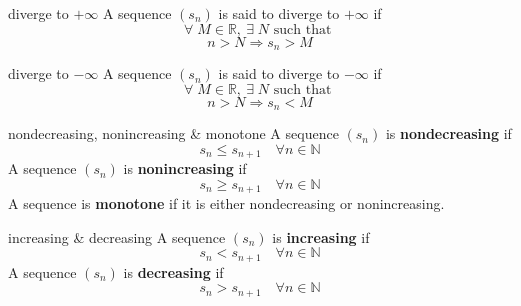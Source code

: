 \documentclass[avery5371,grid]{flashcards}
\newcommand{\N}{\mathbb{N}}
\newcommand{\R}{\mathbb{R}}
\begin{document}

\begin{flashcard}[Definition]{diverge to $+\infty$}
A sequence $(s_{n})$ is said to diverge to $+\infty$ if
\begin{equation*}
\forall \; M \in \R, \ \exists \; N \textrm{ such that }
\end{equation*}
\begin{equation*}
n > N \Rightarrow s_{n} > M
\end{equation*}
\end{flashcard}

\begin{flashcard}[Definition]{diverge to $-\infty$}
A sequence $(s_{n})$ is said to diverge to $-\infty$ if
\begin{equation*}
\forall \; M \in \R, \ \exists \; N \textrm{ such that }
\end{equation*}
\begin{equation*}
n > N \Rightarrow s_{n} < M
\end{equation*}
\end{flashcard}

\begin{flashcard}[Definition]{nondecreasing, nonincreasing \& monotone}
A sequence $(s_{n})$ is \mbox{\textbf{nondecreasing}} if
\begin{equation*}
s_{n} \leq s_{n+1} \quad \forall n \in \N
\end{equation*}
A sequence $(s_{n})$ is \mbox{\textbf{nonincreasing}} if
\begin{equation*}
s_{n} \geq s_{n+1} \quad \forall n \in \N
\end{equation*}
A sequence is \mbox{\textbf{monotone}} if it is either nondecreasing
or nonincreasing.
\end{flashcard}

\begin{flashcard}[Definition]{increasing \& decreasing}
A sequence $(s_{n})$ is \mbox{\textbf{increasing}} if
\begin{equation*}
s_{n} < s_{n+1} \quad \forall n \in \N
\end{equation*}
A sequence $(s_{n})$ is \mbox{\textbf{decreasing}} if
\begin{equation*}
s_{n} > s_{n+1} \quad \forall n \in \N
\end{equation*}
\end{flashcard}
\end{document}

